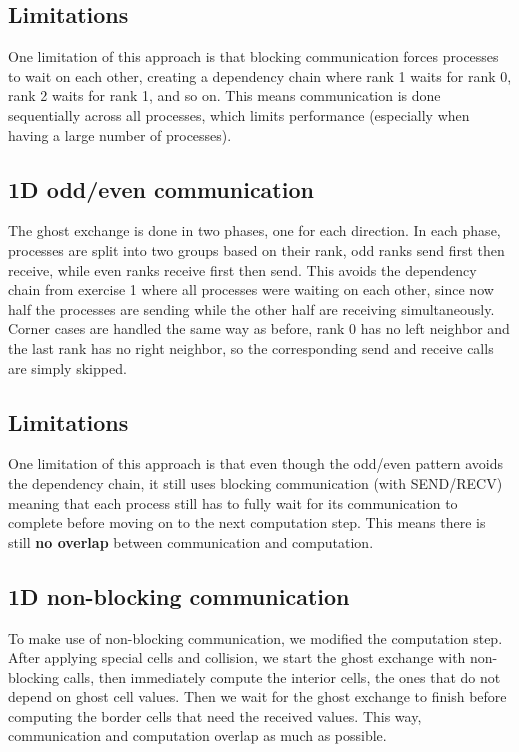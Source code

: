 \documentclass{article}
\begin{document}
\subsection{Limitations}
One limitation of this approach is that blocking communication forces processes to wait on each other, creating a dependency chain where rank 1 waits for rank 0, rank 2 waits for rank 1, and so on. This means communication is done sequentially across all processes, which limits performance (especially when having a large number of processes).

\subsection{1D odd/even communication}
The ghost exchange is done in two phases, one for each direction. In each phase, processes are split into two groups based on their rank, odd ranks send first then receive, while even ranks receive first then send. This avoids the dependency chain from exercise 1 where all processes were waiting on each other, since now half the processes are sending while the other half are receiving simultaneously. Corner cases are handled the same way as before, rank 0 has no left neighbor and the last rank has no right neighbor, so the corresponding send and receive calls are simply skipped.

\subsection{Limitations}
One limitation of this approach is that even though the odd/even pattern avoids the dependency chain, it still uses blocking communication (with SEND/RECV) meaning that each process still has to fully wait for its communication to complete before moving on to the next computation step. This means there is still \textbf{no overlap} between communication and computation.


\subsection{1D non-blocking communication}

To make use of non-blocking communication, we modified the computation step. After applying special cells and collision, we start the ghost exchange with non-blocking calls, then immediately compute the interior cells, the ones that do not depend on ghost cell values. Then we wait for the ghost exchange to finish before computing the border cells that need the received values. This way, communication and computation overlap as much as possible.
\end{document}
